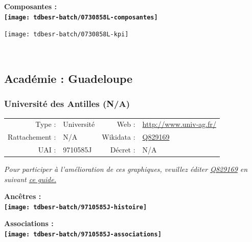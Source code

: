 \documentclass[12pt,french,]{article}
\begin{document}
\begin{center} \bf Composantes : \\  
\texttt{[image: tdbesr-batch/0730858L-composantes]} \end{center}

\begin{center}\texttt{[image: tdbesr-batch/0730858L-kpi]} \end{center}\checkoddpage

\ifoddpage ~\newpage \fi   

\hypertarget{acaduxe9mie-guadeloupe}{%
\subsection{Académie : Guadeloupe}\label{acaduxe9mie-guadeloupe}}

\hypertarget{universituxe9-des-antilles-na}{%
\subsubsection{Université des Antilles
(N/A)}\label{universituxe9-des-antilles-na}}

\begin{tabular*}{\textwidth}{rp{5cm}rl}  
\hline  
Type : & Université & Web : &\href{http://www.univ-ag.fr/}{http://www.univ-ag.fr/} \\  
Rattachement : & N/A & Wikidata : & \href{https://www.wikidata.org/entity/Q829169}{Q829169} \\  
UAI : & 9710585J & Décret : & N/A \\  
\hline  
\end{tabular*}

\textit{\scriptsize Pour participer à l'amélioration de ces graphiques, veuillez éditer  \href{https://www.wikidata.org/entity/Q829169}{Q829169}  en suivant \href{https://github.com/cpesr/wikidataESR/blob/master/Rmd/wikidataESR.md}{ce guide.}}

\vspace{1cm}  
\begin{minipage}[b]{0.50\textwidth}\begin{center} \bf Ancêtres : \\  
\texttt{[image: tdbesr-batch/9710585J-histoire]} \end{center}\end{minipage}\begin{minipage}[b]{0.50\textwidth}\begin{center} \bf Associations : \\  
\texttt{[image: tdbesr-batch/9710585J-associations]} \end{center}\end{minipage}
\end{document}
